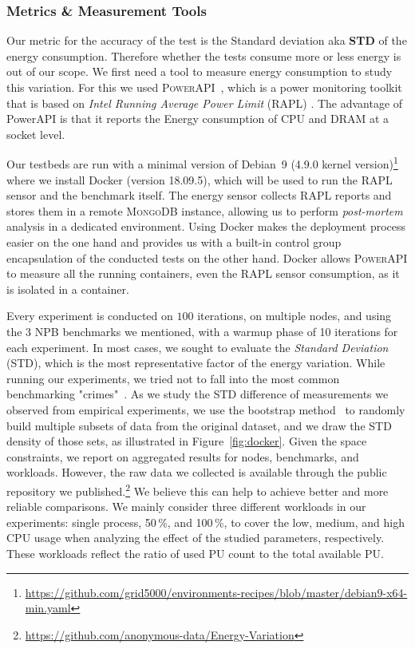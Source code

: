 \subsubsection{Metrics \& Measurement Tools}
Our metric for the accuracy of the test is the Standard deviation aka \textbf{STD} of the energy consumption. Therefore whether the tests consume more or less energy is out of our scope.
We first need a tool to measure energy consumption to study this variation. For this we used \textsc{PowerAPI}~\cite{DBLP:journals/jss/ColmantRKSFS18}, which is a power monitoring toolkit that is based on \emph{Intel Running Average Power Limit} (RAPL) \cite{Khan:2018:RAE:3199681.3177754}. The advantage of PowerAPI is that it reports the Energy consumption of CPU and DRAM at a socket level.

Our testbeds are run with a minimal version of Debian \,9 (4.9.0 kernel version)\footnote{\url{https://github.com/grid5000/environments-recipes/blob/master/debian9-x64-min.yaml}} where we install Docker (version 18.09.5), which will be used to run the RAPL sensor and the benchmark itself.
The energy sensor collects RAPL reports and stores them in a remote \textsc{MongoDB} instance, allowing us to perform \emph{post-mortem} analysis in a dedicated environment.
Using Docker makes the deployment process easier on the one hand and provides us with a built-in control group encapsulation of the conducted tests on the other hand.
Docker allows \textsc{PowerAPI} to measure all the running containers, even the RAPL sensor consumption, as it is isolated in a container.

Every experiment is conducted on $100$ iterations, on multiple nodes, and using the 3 NPB benchmarks we mentioned, with a warmup phase of 10 iterations for each experiment.
In most cases, we sought to evaluate the \emph{Standard Deviation} (STD), which is the most representative factor of the energy variation.
While running our experiments, we tried not to fall into the most common benchmarking "crimes"~\cite{DBLP:journals/corr/abs-1801-02381}.
As we study the STD difference of measurements we observed from empirical experiments, we use the bootstrap method~\cite{efron2000bootstrap} to randomly build multiple subsets of data from the original dataset, and we draw the STD density of those sets, as illustrated in Figure~\ref{fig:docker}.
Given the space constraints, we report on aggregated results for nodes, benchmarks, and workloads.
However, the raw data we collected is available through the public repository we published.\footnote{\url{https://github.com/anonymous-data/Energy-Variation}}
We believe this can help to achieve better and more reliable comparisons.
We mainly consider three different workloads in our experiments: \textsf{single process}, 50\,\%, and 100\,\%, to cover the low, medium, and high CPU usage when analyzing the effect of the studied parameters, respectively.
These workloads reflect the ratio of used PU count to the total available PU.

